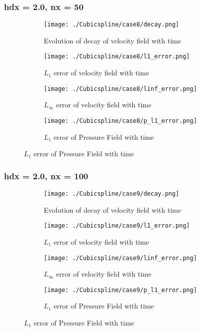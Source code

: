 \documentclass[11pt, a4paper]{article}
\begin{document}
\subsubsection{hdx = 2.0, nx = 50}
\begin{figure}[H]
\begin{subfigure}{0.48\textwidth}
\texttt{[image: ./Cubicspline/case8/decay.png]}
\caption{Evolution of decay of velocity field with time}
\end{subfigure}
\begin{subfigure}{0.48\textwidth}
\texttt{[image: ./Cubicspline/case8/l1\_error.png]}
\caption{$L_1$ error of velocity field with time}
\end{subfigure}
\medskip
\begin{subfigure}{0.48\textwidth}
\texttt{[image: ./Cubicspline/case8/linf\_error.png]}
\caption{$L_\infty$ error of velocity field with time}
\end{subfigure}
\begin{subfigure}{0.48\textwidth}
\texttt{[image: ./Cubicspline/case8/p\_l1\_error.png]}
\caption{$L_1$ error of Pressure Field with time}
\end{subfigure}
\end{figure}

\subsubsection{hdx = 2.0, nx = 100}
\begin{figure}[H]
\begin{subfigure}{0.48\textwidth}
\texttt{[image: ./Cubicspline/case9/decay.png]}
\caption{Evolution of decay of velocity field with time}
\end{subfigure}
\begin{subfigure}{0.48\textwidth}
\texttt{[image: ./Cubicspline/case9/l1\_error.png]}
\caption{$L_1$ error of velocity field with time}
\end{subfigure}
\medskip
\begin{subfigure}{0.48\textwidth}
\texttt{[image: ./Cubicspline/case9/linf\_error.png]}
\caption{$L_\infty$ error of velocity field with time}
\end{subfigure}
\begin{subfigure}{0.48\textwidth}
\texttt{[image: ./Cubicspline/case9/p\_l1\_error.png]}
\caption{$L_1$ error of Pressure Field with time}
\end{subfigure}
\end{figure}
\end{document}
